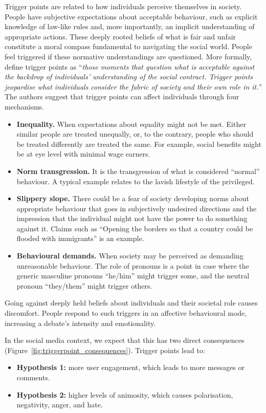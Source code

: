 Trigger points are related to how individuals perceive themselves in society. People have subjective expectations about acceptable behaviour, such as explicit knowledge of law-like rules and, more importantly, an implicit understanding of appropriate actions. These deeply rooted beliefs of what is fair and unfair constitute a moral compass fundamental to navigating the social world. People feel triggered if these normative understandings are questioned. More formally, \citet[246]{mau2023triggerpunkte} define trigger points as ``\textit{those moments that question what is acceptable against the backdrop of individuals' understanding of the social contract. Trigger points jeopardise what individuals consider the fabric of society and their own role in it.}'' 
The authors suggest that trigger points can affect individuals through four mechanisms. 
\begin{itemize}
\item \textbf{Inequality.} When expectations about equality might not be met. Either similar people are treated unequally, or, to the contrary, people who should be treated differently are treated the same. For example, social benefits might be at eye level with minimal wage earners. 
\item \textbf{Norm transgression.} It is the transgression of what is considered ``normal'' behaviour. A typical example relates to the lavish lifestyle of the privileged. 
\item \textbf{Slippery slope.} There could be a fear of society developing norms about appropriate behaviour that goes in subjectively undesired directions and the impression that the individual might not have the power to do something against it. Claims such as ``Opening the borders so that a country could be flooded with immigrants'' is an example. 
\item \textbf{Behavioural demands.} When society may be perceived as demanding unreasonable behaviour. The role of pronouns is a point in case where the generic masculine pronouns ``he/him'' might trigger some, and the neutral pronoun ``they/them'' might trigger others.
\end{itemize}
Going against deeply held beliefs about individuals and their societal role causes discomfort. People respond to such triggers in an affective behavioural mode, increasing a debate's intensity and emotionality. %

In the social media context, we expect that this has two direct consequences (Figure~\ref{fig:triggerpoint_consequences}). Trigger points lead to:
\begin{itemize}
    \item \textbf{Hypothesis 1:} more user engagement, which leads to more messages or comments.
    \item \textbf{Hypothesis 2:} higher levels of animosity, which causes polarisation, negativity, anger, and hate.
\end{itemize}


